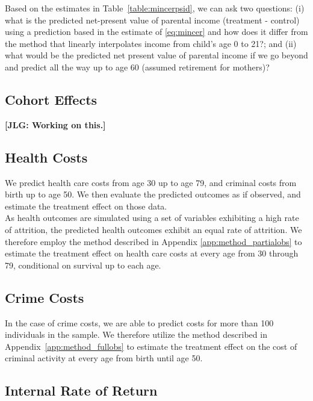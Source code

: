 \noindent Based on the estimates in Table~\ref{table:mincerpsid}, we can ask two questions: (i) what is the predicted net-present value of parental income (treatment - control) using a prediction based in the estimate of \eqref{eq:mincer} and how does it differ from the method that linearly interpolates income from child's age 0 to 21?; and (ii) what would be the predicted net present value of parental income if we go beyond and predict all the way up to age 60 (assumed retirement for mothers)?

\subsection{Cohort Effects}\label{app:cohorteffects}

\textbf{[JLG: Working on this.]}

\subsection{Health Costs}

\noindent We predict health care costs from age 30 up to age 79, and criminal costs from birth
up to age 50. We then evaluate the predicted outcomes as if observed, and estimate the
treatment effect on those data.\\

\noindent As health outcomes are simulated using a set of variables exhibiting a high rate of attrition, the
predicted health outcomes exhibit an equal rate of attrition. We therefore employ the method described
in Appendix \ref{app:method_partialobs} to estimate the treatment effect on health care costs at
every age from 30 through 79, conditional on survival up to each age. \\

\subsection{Crime Costs}

\noindent In the case of crime costs, we are able to predict costs for more than 100 individuals in the
sample. We therefore utilize the method described in Appendix~\ref{app:method_fullobs}
to estimate the treatment effect on the cost of criminal activity at every age from birth until age 50. \\

\subsection{Internal Rate of Return}
\label{app:method_irr}

